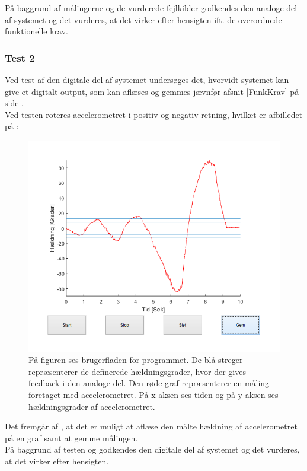 På baggrund af målingerne og de vurderede fejlkilder godkendes den analoge del af systemet og det vurderes, at det virker efter hensigten ift. de overordnede funktionelle krav.\\

\subsubsection{Test 2}
Ved test af den digitale del af systemet undersøges det, hvorvidt systemet kan give et digitalt output, som kan aflæses og gemmes jævnfør afsnit \ref{FunkKrav} på side \pageref{FunkKrav}. \\
Ved testen roteres accelerometret i positiv og negativ retning, hvilket er afbilledet på :
\begin{figure}[H]
	\centering
	\includegraphics[scale=.6]{figures/cProblemloesning/Software.jpg}
	\caption{På figuren ses brugerfladen for programmet. De blå streger repræsenterer de definerede hældningsgrader, hvor der gives feedback i den analoge del. Den røde graf repræsenterer en måling foretaget med accelerometret. På x-aksen ses tiden og på y-aksen ses hældningsgrader af accelerometret.}
	\label{fig:samlet_system_digital}
\end{figure}
\noindent Det fremgår af , at det er muligt at aflæse den målte hældning af accelerometret på en graf samt at gemme målingen.\\
På baggrund af testen og   godkendes den digitale del af systemet og det vurderes, at det virker efter hensigten.